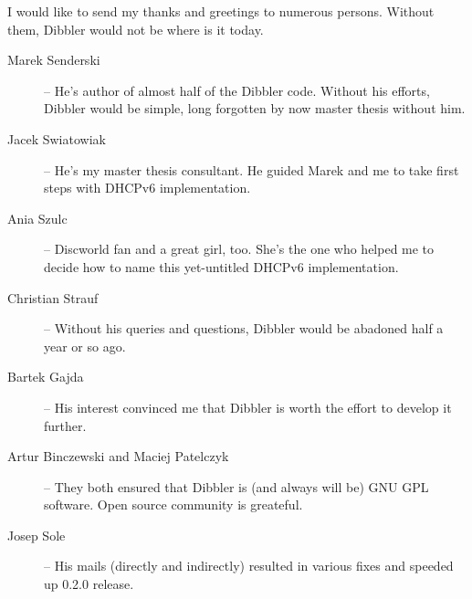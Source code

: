 I would like to send my thanks and greetings to numerous persons.
Without them, Dibbler would not be where is it today.
\begin{description}
\item[Marek Senderski] -- He's author of almost half of the Dibbler
  code. Without his efforts, Dibbler would be simple, long forgotten
  by now master thesis without him.
\item[Jacek Swiatowiak] -- He's my master thesis consultant. He guided 
  Marek and me to take first steps with DHCPv6 implementation.
\item[Ania Szulc] -- Discworld fan and a great girl, too. She's the one
  who helped me to decide how to name this yet-untitled DHCPv6 implementation.
\item[Christian Strauf] -- Without his queries and questions, Dibbler
  would be abadoned half a year or so ago.
\item[Bartek Gajda] -- His interest convinced me that Dibbler is worth
  the effort to develop it further.
\item[Artur Binczewski and Maciej Patelczyk] -- They both ensured that
  Dibbler is (and always will be) GNU GPL software. Open source
  community is greateful.
\item[Josep Sole] -- His mails (directly and indirectly) resulted in
  various fixes and speeded up 0.2.0 release.
\end{description}